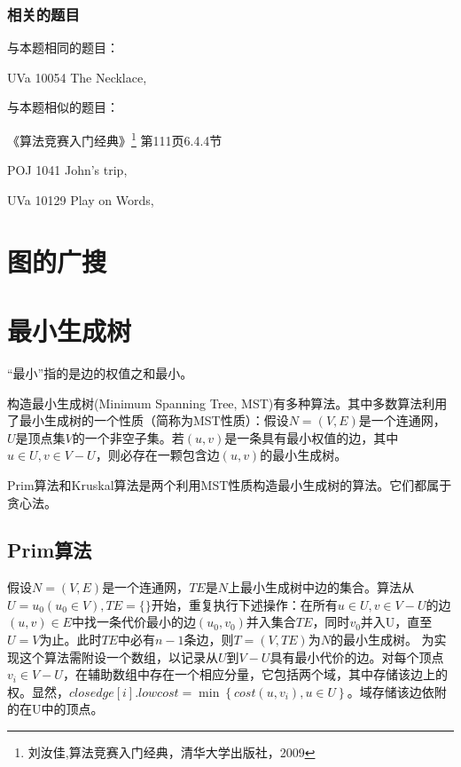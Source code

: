 \subsubsection{相关的题目}

与本题相同的题目：
\begindot
\item  UVa 10054 The Necklace, 
\myenddot

与本题相似的题目：
\begindot
\item 《算法竞赛入门经典》\footnote{刘汝佳,算法竞赛入门经典，清华大学出版社，2009} 第111页6.4.4节
\item POJ 1041 John's trip, 
\item UVa 10129 Play on Words, 
\myenddot


\section{图的广搜} %



\section{最小生成树} %
“最小”指的是边的权值之和最小。

构造最小生成树(Minimum Spanning Tree, MST)有多种算法。其中多数算法利用了最小生成树的一个性质（简称为MST性质）：假设$N=(V, E)$是一个连通网，$U$是顶点集$V$的一个非空子集。若$(u, v)$是一条具有最小权值的边，其中$u \in U, v \in V-U$，则必存在一颗包含边$(u, v)$的最小生成树。

Prim算法和Kruskal算法是两个利用MST性质构造最小生成树的算法。它们都属于贪心法。

\subsection{Prim算法}
假设$N=(V, E)$是一个连通网，$TE$是$N$上最小生成树中边的集合。算法从$U={u_0}(u_0 \in V), TE=\{\}$开始，重复执行下述操作：在所有$u \in U, v \in V-U$的边$(u, v) \in E$中找一条代价最小的边$(u_0, v_0)$并入集合$TE$，同时$v_0$并入U，直至$U=V$为止。此时$TE$中必有$n-1$条边，则$T=(V, TE)$为$N$的最小生成树。
为实现这个算法需附设一个数组，以记录从$U$到$V-U$具有最小代价的边。对每个顶点$v_i \in V-U$，在辅助数组中存在一个相应分量，它包括两个域，其中存储该边上的权。显然，$closedge[i].lowcost=\min\left\{cost(u, v_i), u \in U\right\}$。域存储该边依附的在U中的顶点。

